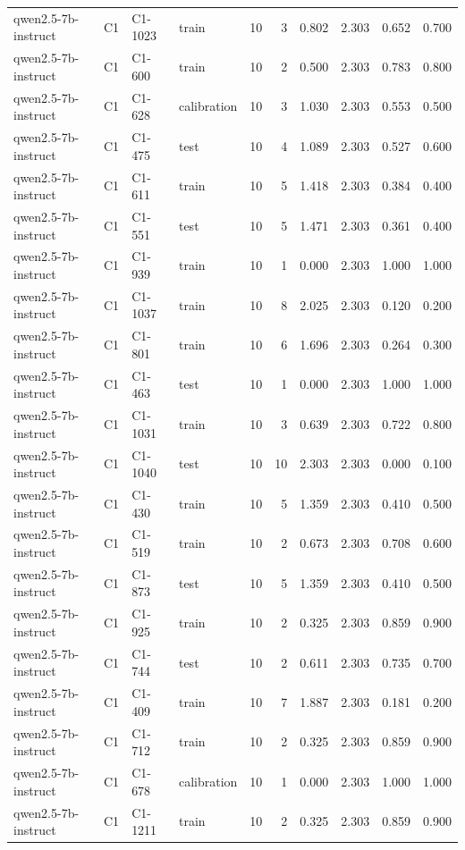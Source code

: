 \begin{table}
\begin{tabular}{llllrrrrrr}
qwen2.5-7b-instruct & C1 & C1-1023 & train & 10 & 3 & 0.802 & 2.303 & 0.652 & 0.700 \\
qwen2.5-7b-instruct & C1 & C1-600 & train & 10 & 2 & 0.500 & 2.303 & 0.783 & 0.800 \\
qwen2.5-7b-instruct & C1 & C1-628 & calibration & 10 & 3 & 1.030 & 2.303 & 0.553 & 0.500 \\
qwen2.5-7b-instruct & C1 & C1-475 & test & 10 & 4 & 1.089 & 2.303 & 0.527 & 0.600 \\
qwen2.5-7b-instruct & C1 & C1-611 & train & 10 & 5 & 1.418 & 2.303 & 0.384 & 0.400 \\
qwen2.5-7b-instruct & C1 & C1-551 & test & 10 & 5 & 1.471 & 2.303 & 0.361 & 0.400 \\
qwen2.5-7b-instruct & C1 & C1-939 & train & 10 & 1 & 0.000 & 2.303 & 1.000 & 1.000 \\
qwen2.5-7b-instruct & C1 & C1-1037 & train & 10 & 8 & 2.025 & 2.303 & 0.120 & 0.200 \\
qwen2.5-7b-instruct & C1 & C1-801 & train & 10 & 6 & 1.696 & 2.303 & 0.264 & 0.300 \\
qwen2.5-7b-instruct & C1 & C1-463 & test & 10 & 1 & 0.000 & 2.303 & 1.000 & 1.000 \\
qwen2.5-7b-instruct & C1 & C1-1031 & train & 10 & 3 & 0.639 & 2.303 & 0.722 & 0.800 \\
qwen2.5-7b-instruct & C1 & C1-1040 & test & 10 & 10 & 2.303 & 2.303 & 0.000 & 0.100 \\
qwen2.5-7b-instruct & C1 & C1-430 & train & 10 & 5 & 1.359 & 2.303 & 0.410 & 0.500 \\
qwen2.5-7b-instruct & C1 & C1-519 & train & 10 & 2 & 0.673 & 2.303 & 0.708 & 0.600 \\
qwen2.5-7b-instruct & C1 & C1-873 & test & 10 & 5 & 1.359 & 2.303 & 0.410 & 0.500 \\
qwen2.5-7b-instruct & C1 & C1-925 & train & 10 & 2 & 0.325 & 2.303 & 0.859 & 0.900 \\
qwen2.5-7b-instruct & C1 & C1-744 & test & 10 & 2 & 0.611 & 2.303 & 0.735 & 0.700 \\
qwen2.5-7b-instruct & C1 & C1-409 & train & 10 & 7 & 1.887 & 2.303 & 0.181 & 0.200 \\
qwen2.5-7b-instruct & C1 & C1-712 & train & 10 & 2 & 0.325 & 2.303 & 0.859 & 0.900 \\
qwen2.5-7b-instruct & C1 & C1-678 & calibration & 10 & 1 & 0.000 & 2.303 & 1.000 & 1.000 \\
qwen2.5-7b-instruct & C1 & C1-1211 & train & 10 & 2 & 0.325 & 2.303 & 0.859 & 0.900 \\

\end{tabular}
\end{table}
